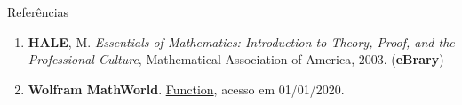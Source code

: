 \begin{frame}[fragile]{Referências}

    \begin{enumerate}
        \item \textbf{HALE}, M. \textit{Essentials of Mathematics: Introduction to Theory, Proof, and the Professional Culture}, Mathematical Association of America, 2003. (\textbf{eBrary})

        \item \textbf{Wolfram MathWorld}. \href{http://mathworld.wolfram.com/Function.html}{Function}, acesso em 01/01/2020.

    \end{enumerate}

\end{frame}
